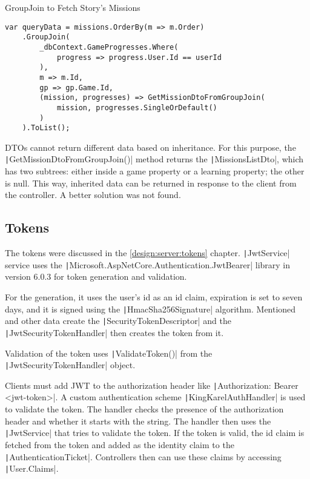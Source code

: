 \begin{listing}
    \caption{GroupJoin to Fetch Story's Missions}
    \label{listing:groupjoin}
    \begin{verbatim}
var queryData = missions.OrderBy(m => m.Order)
    .GroupJoin(
        _dbContext.GameProgresses.Where(
            progress => progress.User.Id == userId
        ),
        m => m.Id,
        gp => gp.Game.Id,
        (mission, progresses) => GetMissionDtoFromGroupJoin(
            mission, progresses.SingleOrDefault()
        )
    ).ToList();
    \end{verbatim}
\end{listing}

DTOs cannot return different data based on inheritance.
For this purpose, the \texttt|GetMissionDtoFromGroupJoin()| method returns the \texttt|MissionsListDto|, which has two subtrees: either inside a game property or a learning property; the other is null.
This way, inherited data can be returned in response to the client from the controller.
A better solution was not found.

\subsection{Tokens}

The tokens were discussed in the \ref{design:server:tokens} chapter.
\texttt|JwtService| service uses the \texttt|Microsoft.AspNetCore.Authentication.JwtBearer| library in version 6.0.3 for token generation and validation.

For the generation, it uses the user's id as an id claim, expiration is set to seven days, and it is signed using the \texttt|HmacSha256Signature| algorithm.
Mentioned and other data create the \texttt|SecurityTokenDescriptor| and the \texttt|JwtSecurityTokenHandler| then creates the token from it.

Validation of the token uses \texttt|ValidateToken()| from the \linebreak\texttt|JwtSecurityTokenHandler| object.

Clients must add JWT to the authorization header like \linebreak\texttt|Authorization: Bearer <jwt-token>|.
A custom authentication scheme \linebreak\texttt|KingKarelAuthHandler| is used to validate the token.
The handler checks the presence of the authorization header and whether it starts with the  string.
The handler then uses the \texttt|JwtService| that tries to validate the token.
If the token is valid, the id claim is fetched from the token and added as the identity claim to the \texttt|AuthenticationTicket|.
Controllers then can use these claims by accessing \texttt|User.Claims|.


